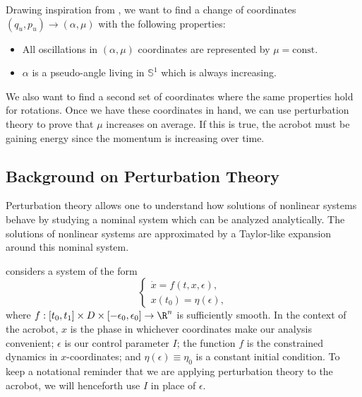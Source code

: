 Drawing inspiration from \citet{dynamic_vhcs_stabilize_closed_orbits}, we want
to find a change of coordinates \((q_u,p_u) \to (\alpha, \mu)\) with the
following properties:
\begin{itemize}
    \item All oscillations in \((\alpha,\mu)\) coordinates are represented by
        \(\mu = \text{const}\).
    \item \(\alpha\) is a pseudo-angle living in \(\mathbb{S}^1\) which is
        always increasing.
\end{itemize}
We also want to find a second set of coordinates where the same properties hold for
rotations.
Once we have these coordinates in hand, we can use perturbation theory to prove
that \(\mu\) increases on average. 
If this is true, the acrobot must be gaining energy since the momentum is
increasing over time.

\subsection*{Background on Perturbation Theory}
Perturbation theory allows one to understand how solutions of nonlinear systems
behave by studying a nominal system which can be analyzed analytically.
The solutions of nonlinear systems are approximated by a Taylor-like expansion
around this nominal system.

\citet{khalil_nonlinear} considers a system of the form
\begin{equation}\label{eqn:khalil-setup}
    \begin{cases}
        \dot{x} = f(t,x,\epsilon), \\
        x(t_0) = \eta(\epsilon),
    \end{cases}
\end{equation}
where 
\(f : [t_0,t_1] \times D \times [-\epsilon_0,\epsilon_0] \rightarrow \R^n\) is
sufficiently smooth.
In the context of the acrobot, \(x\) is the phase in whichever coordinates make
our analysis convenient;
\(\epsilon\) is our control parameter \(I\);
the function \(f\) is the constrained dynamics in \(x\)-coordinates;
and \(\eta(\epsilon) \equiv \eta_0\) is a constant initial condition.
To keep a notational reminder that we are applying perturbation theory to
the acrobot, we will henceforth use \(I\) in place of \(\epsilon\).

